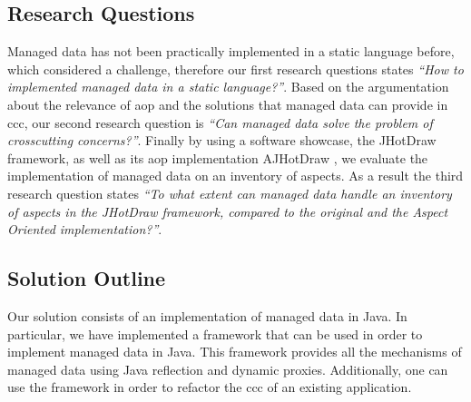 \subsection{Research Questions}\label{Research Questions}
Managed data has not been practically implemented in a static language before, which considered a challenge, therefore our first research questions states 
\textit{``How to implemented managed data in a static language?''}.
Based on the argumentation about the relevance of \ac{aop} and the solutions that managed data can provide in \acrlong{ccc}, our second research question is \textit{``Can managed data solve the problem of crosscutting concerns?''}. 
Finally by using a software showcase, the JHotDraw framework, as well as its \ac{aop} implementation AJHotDraw \cite{marinajhotdraw}, 
we evaluate the implementation of managed data on an inventory of aspects. 
As a result the third research question states \textit{``To what extent can managed data handle an inventory of aspects in the JHotDraw framework, compared to the original and the Aspect Oriented implementation?''}.

\subsection{Solution Outline}\label{Solution Outline}
Our solution consists of an implementation of managed data in Java.
In particular, we have implemented a framework that can be used in order to implement managed data in Java.
This framework provides all the mechanisms of managed data using Java reflection and dynamic proxies. Additionally, one can use the framework in order to refactor the \ac{ccc} of an existing application.

